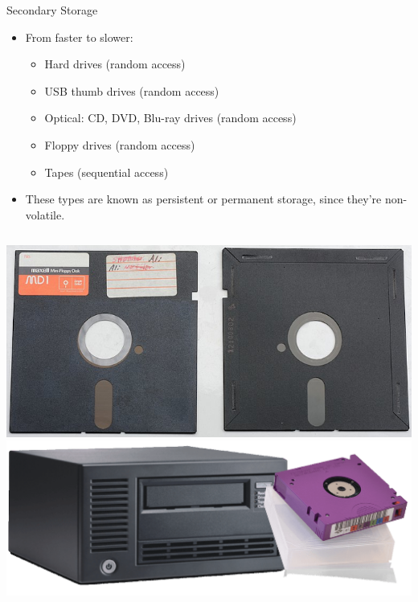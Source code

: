 \documentclass[graphics]{beamer}
\begin{document}
\begin{frame}{Secondary Storage}
    \begin{itemize}
        \item From faster to slower:
        \begin{itemize}
            \item Hard drives (random access)
            \item USB thumb drives (random access)
            \item Optical: CD, DVD, Blu-ray drives (random access)
            \item Floppy drives (random access)
            \item Tapes (sequential access)
        \end{itemize}
        \item These types are known as persistent or permanent storage, since they're non-volatile.
    \end{itemize}
    \begin{columns}
            \includegraphics[scale=0.20]{L02_ArchNumbersSystems/L2_p17_525.png}
            \includegraphics[scale=0.17]{L02_ArchNumbersSystems/L2_p17_tape.png}
    \end{columns}
\end{frame}
\end{document}

